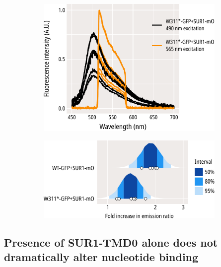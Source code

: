 \begin{figure}[h]
\begin{subfigure}[t]{0.3\textwidth}
		\includegraphics[width=\textwidth]{w311_gfp_mo_spectra_2.pdf}
	\end{subfigure}
	\hfill
	\begin{subfigure}[t]{0.3\textwidth}
		\caption{}\label{ch6fig:gfp_ofp_contrasts_1}
		\centering
		\includegraphics[width=\textwidth]{gfp_ofp_contrasts_1.pdf}
	\end{subfigure}
	\caption[SUR1 associates with WT-GFP and W311*-GFP]{
	}\label{ch6fig:sur_assays}
\end{figure}

\subsection{Presence of SUR1-TMD0 alone does not dramatically alter nucleotide binding}


